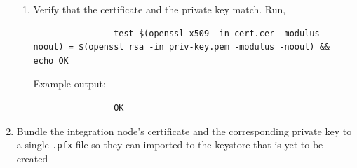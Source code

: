 \documentclass{article}
\begin{document}
\begin{enumerate}[itemsep=4ex]
\begin{enumerate}[itemsep=3ex]
            \item Verify that the certificate and the private key match. Run,
            \begin{lstlisting}
                test $(openssl x509 -in cert.cer -modulus -noout) = $(openssl rsa -in priv-key.pem -modulus -noout) && echo OK
            \end{lstlisting}
            Example output:
            \begin{lstlisting}
                OK
            \end{lstlisting}

        \end{enumerate}

        \item Bundle the integration node's certificate and the corresponding private key to a single \texttt{.pfx} file so they can imported to the keystore that is yet to be created
    \end{enumerate}
\end{document}
